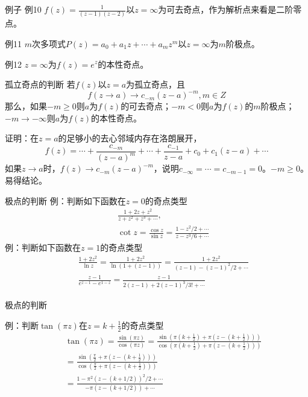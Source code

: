 \documentclass[11pt]{beamer}
\newcommand{\kong}[1][0.5]{\vspace{#1cm}}
\begin{document}
\begin{frame}{例子}
例10 $f(z) = \frac{1}{(z-1)(z-2)}$以$z=\infty$为可去奇点，作为解析点来看是二阶零点。

\kong[1]
例11 $m$次多项式$P(z) = a_0 + a_1 z + \cdots + a_m z^m$以$z=\infty$为$m$阶极点。

\kong[1]
例12 $z=\infty$为$f(z)=e^z$的本性奇点。
\end{frame}

\begin{frame}{孤立奇点的判断}
若$f(z)$以$z=a$为孤立奇点，且
\begin{equation}
f(z \rightarrow a)  \rightarrow c_{-m}(z-a)^{-m},　m \in Z
\end{equation}
那么，如果$-m \geq 0$则$a$为$f(z)$的可去奇点；$-m<0$则$a$为$f(z)$的$m$阶极点；$-m \rightarrow - \infty$则$a$为$f(z)$的本性奇点。

\kong[0.5]
证明：在$z=a$的足够小的去心邻域内存在洛朗展开，
\begin{equation}
f(z) = \cdots + \frac{c_{-m}}{(z-a)^m} + \cdots + \frac{c_{-1}}{z-a} + c_0 + c_1(z-a) + \cdots
\end{equation}
如果$z \rightarrow a$时，$f(z) \rightarrow c_{-m}(z-a)^{-m}$，说明$c_{-\infty} = \cdots = c_{-m-1} = 0$。$-m \geq 0$。易得结论。
\end{frame}

\begin{frame}{极点的判断}
例：判断如下函数在$z=0$的奇点类型
\begin{eqnarray}
&& \frac{1+2z+z^2}{z + z^2 + z^3 + \cdots}, \\
&& \cot z = \frac{\cos z}{\sin z } = \frac{1-z^2/2 + \cdots}{z - z^3/6 + \cdots}
\end{eqnarray}
例：判断如下函数在$z=1$的奇点类型
\begin{eqnarray}
&& \frac{1+2z^2}{\ln z} = \frac{1+2z^2}{ \ln(1+(z-1))} = \frac{1+2z^2}{(z-1) - (z-1)^2/2 + \cdots } \\
&& \frac{z-1}{e^{z-1} - e^{1-z}} = \frac{z-1}{2(z-1) + 2(z-1)^3/3! + \cdots }
\end{eqnarray}
\end{frame}

\begin{frame}{极点的判断}

例：判断$\tan (\pi z)$在$z=k+\frac{1}{2}$的奇点类型
\begin{eqnarray}
&& \tan (\pi z) = \frac{\sin (\pi z)}{\cos (\pi z)}
= \frac{ \sin( \pi( k+\frac{1}{2}) + \pi(z - (k+\frac{1}{2})) ) }{\cos( \pi( k+\frac{1}{2}) + \pi(z - (k+\frac{1}{2})) ) }
\nonumber\\
&& = \frac{ \sin( \frac{\pi}{2} + \pi(z - (k+\frac{1}{2})) ) }{\cos( \frac{\pi}{2} + \pi(z - (k+\frac{1}{2})) ) }
\nonumber\\
&& = \frac{1 - \pi^2(z-(k+1/2))^2/2 + \cdots}{- \pi(z-(k+1/2)) + \cdots }
\end{eqnarray}

\end{frame}
\end{document}
